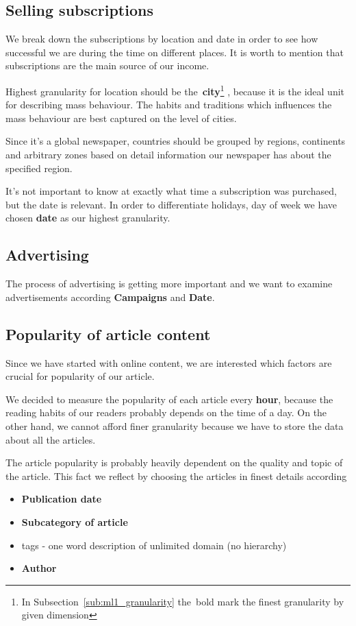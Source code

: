 
\subsection*{Selling subscriptions} 
We break down the subscriptions by location and date in order to see how successful we are during the time on different places. It is worth to mention that subscriptions are the main source of our income. 

Highest granularity for location should be 
the~{\bf city}\footnote{In Subsection~\ref{sub:ml1_granularity} the~bold mark the finest granularity by given dimension} 
, because it is the ideal unit for describing mass behaviour.  The habits and traditions  which influences the mass behaviour are best captured on the level of cities. 

Since it's a global newspaper, countries should be grouped by regions, continents and arbitrary zones based on detail information our newspaper has about the specified region.

It's not important to know at exactly what time a subscription was purchased, but the date is relevant. 
In order to differentiate holidays, day of week we have chosen {\bf date} as our highest granularity. 

\subsection*{Advertising} 
The process of advertising is getting more important
and we want to examine advertisements according {\bf Campaigns} and {\bf Date}.  

\subsection*{Popularity of article content} 
Since we have started with online content, we are interested which factors are crucial for popularity of our article.

We decided to measure the popularity of each article every {\bf hour}, because the reading habits of our readers probably depends on the time of a day. On the other hand, we cannot afford finer granularity because we have to store the data about all the articles.

The article popularity is probably heavily dependent on the quality and topic of the article. 
This fact we reflect by choosing the articles in finest details
according
\begin{itemize}
    \item {\bf Publication date}
    \item {\bf Subcategory of article}
    \item tags - one word description of unlimited domain (no hierarchy)
    \item {\bf Author}
\end{itemize}


